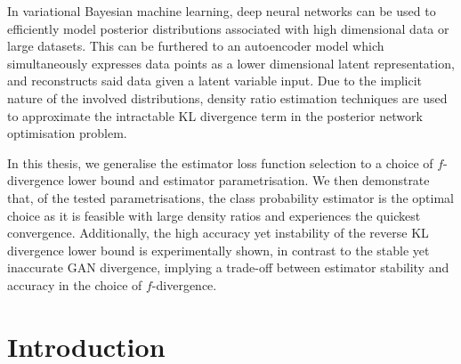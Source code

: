 \documentclass[honours,12pt]{unswthesis}
\newcommand\blankpage{%
    \null
    \thispagestyle{empty}%
    \addtocounter{page}{-1}%
    \newpage}
\numberwithin{equation}{section}
\theoremstyle{definition}
\begin{document}
In variational Bayesian machine learning, deep neural networks can be used to efficiently model posterior distributions associated with high dimensional data or large datasets. This can be furthered to an autoencoder model which simultaneously expresses data points as a lower dimensional latent representation, and reconstructs said data given a latent variable input. Due to the implicit nature of the involved distributions, density ratio estimation techniques are used to approximate the intractable KL divergence term in the posterior network optimisation problem. 

In this thesis, we generalise the estimator loss function selection to a choice of $f$-divergence lower bound and estimator parametrisation. We then demonstrate that, of the tested parametrisations, the class probability estimator is the optimal choice as it is feasible with large density ratios and experiences the quickest convergence. Additionally, the high accuracy yet instability of the reverse KL divergence lower bound is experimentally shown, in contrast to the stable yet inaccurate GAN divergence, implying a trade-off between estimator stability and accuracy in the choice of $f$-divergence.
\afterpage{\blankpage}


\afterpreface
\afterpage{\blankpage}

\chapter{Introduction}\label{intro}
\end{document}
